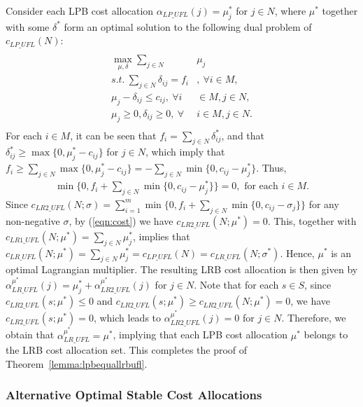 \documentclass[ijoc,nonblindrev]{informs3} %
\begin{document}
Consider each LPB cost allocation  $\alpha_{LP\_UFL}(j)=\mu^*_j$ for $j \in N$, where  $\mu^*$ together with some $\delta^*$ form an optimal solution to the following dual problem of $c_{LP\_UFL}(N)$:
\begin{eqnarray*}
\begin{aligned}
\begin{split}\label{eqn:UFLLRdual1}
 \max_{\mu,\delta} \sum_{j \in N}&\mu_j\\
s.t.~\sum_{j \in N}\delta_{ij} = f_i&, ~\forall i \in M,\\
\mu_j - \delta_{ij} \leq c_{ij}, ~\forall i& \in M, j \in N,\\
 \mu_j \geq 0, \delta_{ij} \geq 0,~\forall &i \in M, j \in N.
\end{split}
\end{aligned}
\end{eqnarray*}
For each $i\in M$, it can be seen that $f_i = \sum_{j\in N}\delta^*_{ij}$, and that $\delta^*_{ij}\geq \max\{0,\mu^*_j-c_{ij}\}$ for $j \in N$, which imply that $f_i \geq \sum_{j\in N}\max\{0,\mu^*_j-c_{ij}\}=-\sum_{j\in N}\min\{0,c_{ij}-\mu^*_j\}$. Thus, 
\begin{eqnarray}
  \min\{0,f_i + \sum_{j\in N}\min\{0,c_{ij}-\mu^*_j\}\} =0, \mbox{ for each $i\in M$.} \label{eqn:cost}
\end{eqnarray}
Since $c_{LR2\_UFL}(N;\sigma)=\sum_{i=1}^{m}\min\{0,f_i+\sum_{j\in N}\min\{0,c_{ij}-\sigma_{j}\}\}$ for any non-negative $\sigma$, by (\ref{eqn:cost}) we have  $c_{LR2\_UFL}(N;\mu^*) = 0$.
This, together with $c_{LR1\_UFL}(N;\mu^*)=\sum_{j\in N}\mu^*_j$, implies that $c_{LR\_UFL}(N;\mu^*) = \sum_{j\in N}\mu^*_j = c_{LP\_UFL}(N)=c_{LR\_UFL}(N;\sigma^*)$.
Hence, $\mu^*$ is an optimal Lagrangian multiplier.
The resulting LRB cost allocation is then given by $\alpha^{\mu^*}_{LR\_UFL}(j) = \mu^*_j + \alpha^{\mu^*}_{LR2\_UFL}(j)$ for $j \in N$. Note that  for each $s\in S$, since $c_{LR2\_UFL}(s;\mu^*)\leq 0$ and $c_{LR2\_UFL}(s;\mu^*)\geq c_{LR2\_UFL}(N;\mu^*)=0$, we have $c_{LR2\_UFL}(s;\mu^*)=0$, which leads to $\alpha^{\mu^*}_{LR2\_UFL}(j) = 0$ for $j\in N$.
Therefore, we obtain that $\alpha^{\mu^*}_{LR\_UFL} = \mu^*$, implying that each LPB cost allocation $\mu^*$ belongs to the LRB cost allocation set. This completes the proof of  Theorem~\ref{lemma:lpbequallrbufl}.
\hfill\Halmos


\subsubsection{Alternative Optimal Stable Cost Allocations}\label{section:uflcomputation}
\end{document}
